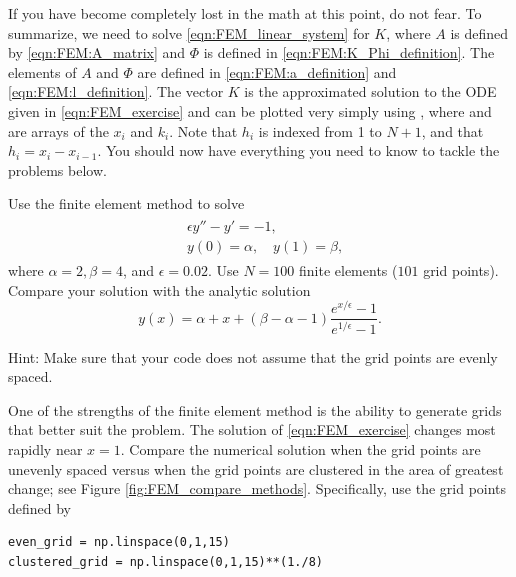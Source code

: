 If you have become completely lost in the math at this point, do not fear.
To summarize, we need to solve \ref{eqn:FEM_linear_system} for $K$, where $A$ is defined by \ref{eqn:FEM:A_matrix} and $\Phi$ is defined in \ref{eqn:FEM:K_Phi_definition}.
The elements of $A$ and $\Phi$ are defined in \ref{eqn:FEM:a_definition} and \ref{eqn:FEM:l_definition}.
The vector $K$ is the approximated solution to the ODE given in \ref{eqn:FEM_exercise} and can be plotted very simply using , where  and  are arrays of the \(x_i\) and \(k_i\).
Note that $h_i$ is indexed from 1 to $N+1$, and that $h_i=x_i-x_{i-1}$.
You should now have everything you need to know to tackle the problems below.


\begin{problem}
Use the finite element method to solve
\begin{align}
	\begin{split}
	&{ }\epsilon y'' - y' = -1,\\
	&{ }y(0) = \alpha, \quad y(1) = \beta,
	\end{split} \label{eqn:FEM_exercise}
\end{align}
where $\alpha = 2, \beta = 4$, and $\epsilon = 0.02$.
Use $N = 100$ finite elements ($101$ grid points).
Compare your solution with the analytic solution
\[y(x) = \alpha + x + (\beta - \alpha - 1 ) \frac{e^{x/\epsilon} -1}{e^{1/\epsilon} -1}.\]

Hint: Make sure that your code does not assume that the grid points are evenly spaced.
\end{problem}

\begin{problem}
One of the strengths of the finite element method is the ability to generate grids that better suit the problem.
The solution of \eqref{eqn:FEM_exercise} changes most rapidly near $x = 1$.
Compare the numerical solution when the grid points are unevenly spaced versus when the grid points are clustered in the area of greatest change; see Figure \ref{fig:FEM_compare_methods}. Specifically, use the grid points defined by
\begin{lstlisting}
even_grid = np.linspace(0,1,15)
clustered_grid = np.linspace(0,1,15)**(1./8)
\end{lstlisting}
\end{problem}

